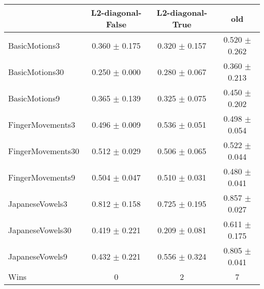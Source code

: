 \begin{tabular}{lccc}
\toprule
{} &  L2-diagonal-False &   L2-diagonal-True &                old \\
\midrule
BasicMotions3     &  0.360 $\pm$ 0.175 &  0.320 $\pm$ 0.157 &  0.520 $\pm$ 0.262 \\
BasicMotions30    &  0.250 $\pm$ 0.000 &  0.280 $\pm$ 0.067 &  0.360 $\pm$ 0.213 \\
BasicMotions9     &  0.365 $\pm$ 0.139 &  0.325 $\pm$ 0.075 &  0.450 $\pm$ 0.202 \\
FingerMovements3  &  0.496 $\pm$ 0.009 &  0.536 $\pm$ 0.051 &  0.498 $\pm$ 0.054 \\
FingerMovements30 &  0.512 $\pm$ 0.029 &  0.506 $\pm$ 0.065 &  0.522 $\pm$ 0.044 \\
FingerMovements9  &  0.504 $\pm$ 0.047 &  0.510 $\pm$ 0.031 &  0.480 $\pm$ 0.041 \\
JapaneseVowels3   &  0.812 $\pm$ 0.158 &  0.725 $\pm$ 0.195 &  0.857 $\pm$ 0.027 \\
JapaneseVowels30  &  0.419 $\pm$ 0.221 &  0.209 $\pm$ 0.081 &  0.611 $\pm$ 0.175 \\
JapaneseVowels9   &  0.432 $\pm$ 0.221 &  0.556 $\pm$ 0.324 &  0.805 $\pm$ 0.041 \\ 
\midrule
Wins &                  0 &                 2 &    7 \\
\bottomrule
\end{tabular}
